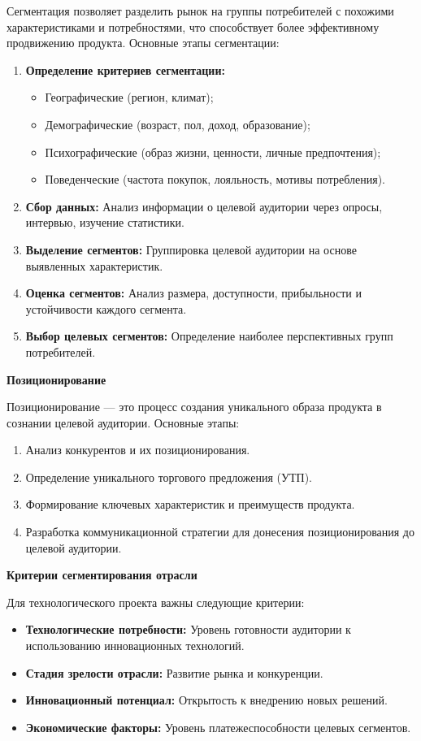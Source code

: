 Сегментация позволяет разделить рынок на группы потребителей с похожими характеристиками и потребностями, что способствует более эффективному продвижению продукта. Основные этапы сегментации:
\begin{enumerate}
    \item \textbf{Определение критериев сегментации:} 
    \begin{itemize}
        \item Географические (регион, климат);
        \item Демографические (возраст, пол, доход, образование);
        \item Психографические (образ жизни, ценности, личные предпочтения);
        \item Поведенческие (частота покупок, лояльность, мотивы потребления).
    \end{itemize}
    \item \textbf{Сбор данных:} Анализ информации о целевой аудитории через опросы, интервью, изучение статистики.
    \item \textbf{Выделение сегментов:} Группировка целевой аудитории на основе выявленных характеристик.
    \item \textbf{Оценка сегментов:} Анализ размера, доступности, прибыльности и устойчивости каждого сегмента.
    \item \textbf{Выбор целевых сегментов:} Определение наиболее перспективных групп потребителей.
\end{enumerate}

\textbf{Позиционирование}

Позиционирование --- это процесс создания уникального образа продукта в сознании целевой аудитории. Основные этапы:
\begin{enumerate}
    \item Анализ конкурентов и их позиционирования.
    \item Определение уникального торгового предложения (УТП).
    \item Формирование ключевых характеристик и преимуществ продукта.
    \item Разработка коммуникационной стратегии для донесения позиционирования до целевой аудитории.
\end{enumerate}

\textbf{Критерии сегментирования отрасли}

Для технологического проекта важны следующие критерии:
\begin{itemize}
    \item \textbf{Технологические потребности:} Уровень готовности аудитории к использованию инновационных технологий.
    \item \textbf{Стадия зрелости отрасли:} Развитие рынка и конкуренции.
    \item \textbf{Инновационный потенциал:} Открытость к внедрению новых решений.
    \item \textbf{Экономические факторы:} Уровень платежеспособности целевых сегментов.
\end{itemize}

